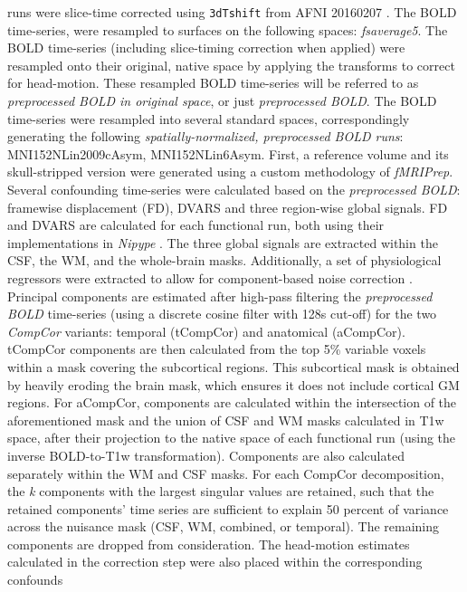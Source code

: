 \documentclass[10pt,letterpaper]{article}
\begin{document}
\begin{description}
runs were slice-time corrected using \texttt{3dTshift} from AFNI
20160207 \cite[RRID:SCR\_005927]{afni}. The BOLD time-series, were
resampled to surfaces on the following spaces: \emph{fsaverage5}. The
BOLD time-series (including slice-timing correction when applied) were
resampled onto their original, native space by applying the transforms
to correct for head-motion. These resampled BOLD time-series will be
referred to as \emph{preprocessed BOLD in original space}, or just
\emph{preprocessed BOLD}. The BOLD time-series were resampled into
several standard spaces, correspondingly generating the following
\emph{spatially-normalized, preprocessed BOLD runs}:
MNI152NLin2009cAsym, MNI152NLin6Asym. First, a reference volume and its
skull-stripped version were generated using a custom methodology of
\emph{fMRIPrep}.
Several confounding time-series were calculated based on the \emph{preprocessed BOLD}:
framewise displacement (FD), DVARS and three region-wise global signals.
FD and DVARS are calculated for each functional run, both using their
implementations in \emph{Nipype} \cite[following the definitions
by]{power_fd_dvars}. The three global signals are extracted within the
CSF, the WM, and the whole-brain masks. Additionally, a set of
physiological regressors were extracted to allow for component-based
noise correction \cite[\emph{CompCor},]{compcor}. Principal
components are estimated after high-pass filtering the
\emph{preprocessed BOLD} time-series (using a discrete cosine filter
with 128s cut-off) for the two \emph{CompCor} variants: temporal
(tCompCor) and anatomical (aCompCor). tCompCor components are then
calculated from the top 5\% variable voxels within a mask covering the
subcortical regions. This subcortical mask is obtained by heavily
eroding the brain mask, which ensures it does not include cortical GM
regions. For aCompCor, components are calculated within the intersection
of the aforementioned mask and the union of CSF and WM masks calculated
in T1w space, after their projection to the native space of each
functional run (using the inverse BOLD-to-T1w transformation).
Components are also calculated separately within the WM and CSF masks.
For each CompCor decomposition, the \emph{k} components with the largest
singular values are retained, such that the retained components' time
series are sufficient to explain 50 percent of variance across the
nuisance mask (CSF, WM, combined, or temporal). The remaining components
are dropped from consideration. The head-motion estimates calculated in
the correction step were also placed within the corresponding confounds

\end{description}
\end{document}
